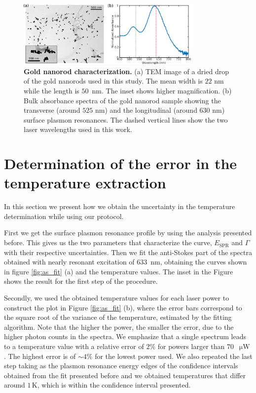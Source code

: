 \documentclass[journal=nalefd,manuscript=letter]{achemso}
\newcommand{\K}{\ensuremath{\,\textrm{K}}}
\newcommand{\nm}{\ensuremath{\,\textrm{nm}}}
\newcommand{\uW}{\ensuremath{\,\upmu\textrm{W}}}
\begin{document}
\begin{figure}[htp] \centering
\includegraphics[width=0.8\textwidth]{Figures/Supplementary/07_GNRs_Characterization_TEM/GNRs_characterization.png}
\caption{\textbf{Gold nanorod characterization.} (a) TEM image of a dried drop of  the gold nanorods used in this study. The mean width is $22$ nm while the length is $50$ \nm. The inset shows higher magnification. (b) Bulk absorbance spectra of the gold nanorod sample showing the transverse (around $525$ nm) and the longitudinal (around $630$ nm) surface plasmon resonances. The dashed vertical lines show the two laser wavelengths used in this work.}
	\label{fg:nr-char}
\end{figure}


\pagebreak
\section{Determination of the error in the temperature extraction}\label{sec:discussion_errors} 

In this section we present how we obtain the uncertainty in the temperature determination
while using our protocol. 

First we get the surface plasmon resonance profile by using the analysis presented before.
This gives us the two parameters that characterize the curve, $E_\textrm{SPR}$ and $\Gamma$
with their respective uncertainties. Then we fit the anti-Stokes part of the spectra obtained with 
nearly resonant excitation of $633$ \nm, obtaining the curves shown in figure \ref{fig:as_fit} (a) and
the temperature values. The inset in the Figure shows the result for the first step of the procedure. 

Secondly, we used the obtained temperature values for each laser power to construct the plot in Figure 
\ref{fig:as_fit} (b), where the error bars correspond to the square root of the variance of 
the temperature, estimated by the fitting algorithm.
Note that the higher the power, the smaller the error, due to the higher photon counts in 
the spectra. We emphasize that a single spectrum leads to a temperature value with a 
relative error of $2\%$ for powers larger than $70$ \uW. The highest error is of $\sim 4\%$ for the 
lowest power used. We also repeated the last step taking
as the plasmon resonance energy edges of the confidence intervals obtained from the fit presented
before and we obtained temperatures that differ around $1\K$, which is within the confidence interval
presented. 
\end{document}
